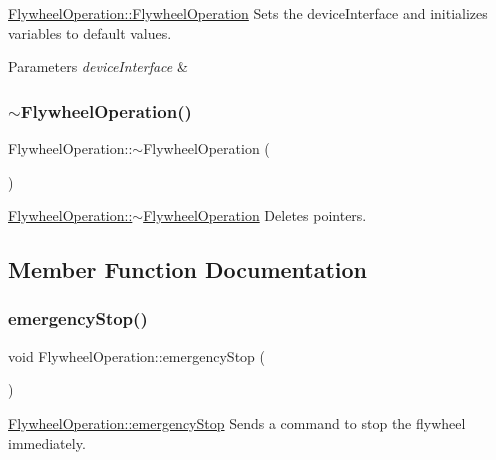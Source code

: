\hyperlink{class_flywheel_operation_a4735eb5ddf58ba1d0bf93e37a2885c76}{Flywheel\+Operation\+::\+Flywheel\+Operation} Sets the device\+Interface and initializes variables to default values. 


\begin{DoxyParams}{Parameters}
{\em device\+Interface} & \\
\hline
\end{DoxyParams}
\hypertarget{class_flywheel_operation_af8bc6d0e4f8dde30c067a97c5d8d0953}{}\label{class_flywheel_operation_af8bc6d0e4f8dde30c067a97c5d8d0953} 
\subsubsection{\texorpdfstring{$\sim$\+Flywheel\+Operation()}{~FlywheelOperation()}}
{\footnotesize\ttfamily Flywheel\+Operation\+::$\sim$\+Flywheel\+Operation (\begin{DoxyParamCaption}{ }\end{DoxyParamCaption})}



\hyperlink{class_flywheel_operation_af8bc6d0e4f8dde30c067a97c5d8d0953}{Flywheel\+Operation\+::$\sim$\+Flywheel\+Operation} Deletes pointers. 



\subsection{Member Function Documentation}
\hypertarget{class_flywheel_operation_a6a393e52299f7a48950f019d0f3db7de}{}\label{class_flywheel_operation_a6a393e52299f7a48950f019d0f3db7de} 
\subsubsection{\texorpdfstring{emergency\+Stop()}{emergencyStop()}}
{\footnotesize\ttfamily void Flywheel\+Operation\+::emergency\+Stop (\begin{DoxyParamCaption}{ }\end{DoxyParamCaption})}



\hyperlink{class_flywheel_operation_a6a393e52299f7a48950f019d0f3db7de}{Flywheel\+Operation\+::emergency\+Stop} Sends a command to stop the flywheel immediately. 


